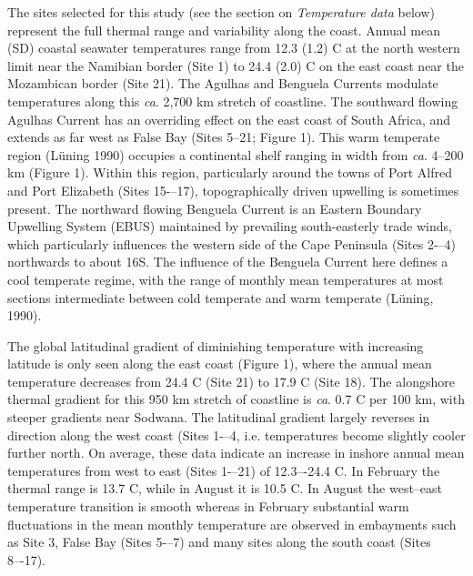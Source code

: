 \documentclass[a4paper,10pt,review]{elsarticle}
\begin{document}
The sites selected for this study (see the section on \emph{Temperature data} below) represent the full thermal range and variability along the coast. Annual mean (SD) coastal seawater temperatures range from 12.3 (1.2) \degree C at the north western limit near the Namibian border (Site 1) to 24.4 (2.0) \degree C on the east coast near the Mozambican border (Site 21). The Agulhas and Benguela Currents modulate temperatures along this \emph{ca}. 2,700 km stretch of coastline. The southward flowing Agulhas Current has an overriding effect on the east coast of South Africa, and extends as far west as False Bay (Sites 5--21; Figure 1). This warm temperate region (Lüning 1990) occupies a continental shelf ranging in width from \emph{ca}. 4--200 km (Figure 1). Within this region, particularly around the towns of Port Alfred and Port Elizabeth (Sites 15-–17), topographically driven upwelling is sometimes present. The northward flowing Benguela Current is an Eastern Boundary Upwelling System (EBUS) maintained by prevailing south-easterly trade winds, which particularly influences the western side of the Cape Peninsula (Sites 2-–4) northwards to about 16\degree S. The inﬂuence of the Benguela Current here deﬁnes a cool temperate regime, with the range of monthly mean temperatures at most sections intermediate between cold temperate and warm temperate (Lüning, 1990).

The global latitudinal gradient of diminishing temperature with increasing latitude is only seen along the east coast (Figure 1), where the annual mean temperature decreases from 24.4 \degree C (Site 21) to 17.9 \degree C (Site 18). The alongshore thermal gradient for this 950 km stretch of coastline is \emph{ca}. 0.7 \degree C per 100 km, with steeper gradients near Sodwana. The latitudinal gradient largely reverses in direction along the west coast (Sites 1-–4, i.e. temperatures become slightly cooler further north. On average, these data indicate an increase in inshore annual mean temperatures from west to east (Sites 1-–21) of 12.3–-24.4 \degree C. In February the thermal range is 13.7 \degree C, while in August it is 10.5 \degree C. In August the west–east temperature transition is smooth whereas in February substantial warm ﬂuctuations in the mean monthly temperature are observed in embayments such as Site 3, False Bay (Sites 5-–7) and many sites along the south coast (Sites 8–-17).
\end{document}
